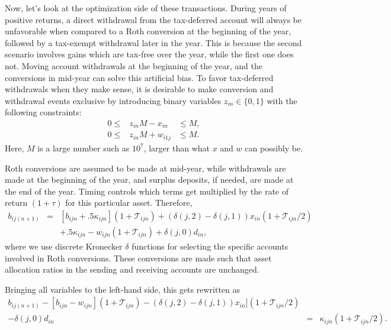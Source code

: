 \documentclass{report}[fleqn,12pt]
\begin{document}
	Now, let's look at the optimization side of these transactions.
	During years of positive returns,
	a direct withdrawal from the tax-deferred account will always
	be unfavorable when compared to a Roth conversion
	at the beginning of the year, followed
	by a tax-exempt withdrawal later in the year.
	This is because the second
	scenario involves gains which are tax-free over the year, while
	the first one does not. Moving account withdrawals at the beginning
	of the year, and the conversions in mid-year can solve this artificial bias.
	To favor tax-deferred withdrawals when they make sense,
	it is desirable to make conversion and withdrawal events exclusive 
	by introducing binary variables $z_{in} \in \{0, 1\}$ with the following constraints:
	\begin{eqnarray}
		\label{Eq:Binary}
		0 \le& z_{in}M - x_{in} &\le M, \nonumber \\
		0 \le& z_{in}M + w_{i1j} &\le M.
	\end{eqnarray}
	Here, $M$ is a large number such as $10^7$, larger than what $x$ and $w$ can possibly be.

	Roth conversions are assumed to be made at mid-year, while withdrawals
	are made at the beginning of the year, and surplus deposits,
	if needed, are made at the end of the year.
	Timing controls which terms get multiplied by the rate of return $(1 + \tau)$
	for this particular asset.
	Therefore,
	\begin{eqnarray}
		\label{Eq:C3a}
		b_{ij(n+1)} &=& [b_{ijn} + .5\kappa_{ijn}](1 + \mathcal{T}_{ijn})
		+ (\delta(j, 2) - \delta(j, 1))x_{in} (1 + \mathcal{T}_{ijn}/2)
		\nonumber \\
		&& 
		+ .5 \kappa_{ijn} 
		- w_{ijn} (1 + \mathcal{T}_{ijn})
		+ \delta(j, 0)d_{in},
	\end{eqnarray}
	where we use discrete Kronecker $\delta$ functions for selecting the specific accounts involved
	in Roth conversions. These conversions are made such that asset allocation
	ratios in the sending and receiving accounts are unchanged.

	Bringing all variables
	to the left-hand side, this gets rewritten as
	\begin{eqnarray}
		\label{Eq:C3}
		b_{ij(n+1)} - [b_{ijn} - w_{ijn}] (1 + \mathcal{T}_{ijn})
		- (\delta(j, 2) - \delta(j, 1))x_{in}](1 + \mathcal{T}_{ijn}/2)
		&& \nonumber \\
		- \delta(j, 0)d_{in} 
		&=& \kappa_{ijn} (1 + \mathcal{T}_{ijn}/2).
	\end{eqnarray}
\end{document}
